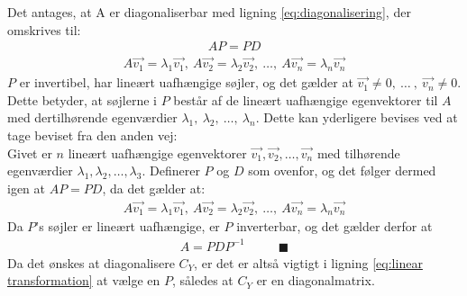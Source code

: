 Det antages, at A er diagonaliserbar med ligning \ref{eq:diagonalisering}, der omskrives til:
\begin{align*} AP = PD \end{align*}
\begin{align*} A\vec{v_1} = \lambda_1\vec{v_1},\ A\vec{v_2} = \lambda_2\vec{v_2},\ …,\ A\vec{v_n} = \lambda_n\vec{v_n} \end{align*}
$P$ er invertibel, har lineært uafhængige søjler, og det gælder at $ \vec{v_1} \neq 0,\ …\ ,\ \vec{v_n} \neq 0 $. Dette betyder, at søjlerne i $P$ består af de lineært uafhængige egenvektorer til $A$ med dertilhørende egenværdier $\lambda_1,\ \lambda_2,\ …,\ \lambda_n$. Dette kan yderligere bevises ved at tage beviset fra den anden vej:\\
Givet er $n$ lineært uafhængige egenvektorer $\vec{v_1}, \vec{v_2}, \hdots, \vec{v_n}$ med tilhørende egenværdier $\lambda_1, \lambda_2, …, \lambda_3$. Definerer $P$ og $D$ som ovenfor, og det følger dermed igen at $AP = PD$, da det gælder at:
\begin{align*} A\vec{v_1} = \lambda_1\vec{v_1},\ A\vec{v_2} = \lambda_2\vec{v_2},\ …,\ A\vec{v_n} = \lambda_n\vec{v_n} \end{align*}
Da $P$'s søjler er lineært uafhængige, er $P$ inverterbar, og det gælder derfor at
\begin{align*} A = PDP^{-1} \phantom{mmm} \blacksquare \end{align*}
Da det ønskes at diagonalisere $C_Y$, er det er altså vigtigt i ligning \vref{eq:linear transformation} at vælge en $P$, således at $C_Y$ er en diagonalmatrix.

%

